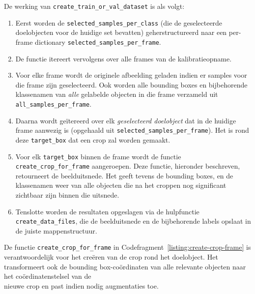 De werking van \texttt{create\_train\_or\_val\_dataset} is als volgt:
\begin{enumerate}
    \item Eerst worden de \texttt{selected\_samples\_per\_class} (die de geselecteerde doelobjecten voor de huidige set bevatten) 
    geherstructureerd naar een per-frame dictionary \texttt{selected\_samples\_per\_frame}.
    \item De functie itereert vervolgens over alle frames van de kalibratieopname.
    \item Voor elke frame wordt de originele afbeelding geladen indien er samples voor die frame zijn geselecteerd. 
    Ook worden alle bounding boxes en bijbehorende klassenamen van 
    \textit{alle} gelabelde objecten in die frame verzameld uit \texttt{all\_samples\_per\_frame}.
    \item Daarna wordt geïtereerd over elk \textit{geselecteerd doelobject}
    dat in de huidige frame aanwezig is (opgehaald uit \texttt{selected\_samples\_per\_frame}). 
    Het is rond deze \texttt{target\_box} dat een crop zal worden gemaakt.
    \item Voor elk \texttt{target\_box} binnen de frame wordt de functie\\ \texttt{create\_crop\_for\_frame} aangeroepen. 
    Deze functie, hieronder beschreven, retourneert de beelduitsnede. Het geeft tevens de bounding boxes, en de klassenamen 
    weer van alle objecten die na het croppen nog significant zichtbaar zijn binnen die uitsnede.
    \item Tenslotte worden de resultaten opgeslagen via de hulpfunctie \texttt{create\_data\-\_files},
    die de beelduitsnede en de bijbehorende labels opslaat in de juiste mappenstructuur.
\end{enumerate}

De functie \texttt{create\_crop\_for\_frame} in Codefragment~\ref{listing:create-crop-frame} 
is verantwoordelijk voor het creëren van de crop rond het doelobject.
Het transformeert ook de bounding box-coördinaten van alle relevante objecten naar het coördinatenstelsel van de\\ nieuwe crop 
en past indien nodig augmentaties toe.

